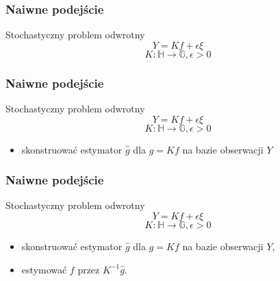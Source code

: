 \documentclass{beamer}
\begin{document}
\begin{frame}\frametitle{Naiwne podejście}
\begin{block}{Stochastyczny problem odwrotny}
\begin{displaymath}
Y=Kf+\epsilon\xi
\end{displaymath}
\begin{displaymath}
K\colon \mathbb{H}\to \mathbb{G}, \epsilon>0
\end{displaymath}
\end{block}
\end{frame}

\begin{frame}\frametitle{Naiwne podejście}
\begin{block}{Stochastyczny problem odwrotny}
\begin{displaymath}
Y=Kf+\epsilon\xi
\end{displaymath}
\begin{displaymath}
K\colon \mathbb{H}\to \mathbb{G}, \epsilon>0
\end{displaymath}
\end{block}
\begin{block}{}
\begin{itemize}
\item skonstruować estymator $\hat{g}$ dla $g=Kf$ na bazie obserwacji $Y$
\end{itemize}
\end{block}
\end{frame}

\begin{frame}\frametitle{Naiwne podejście}
\begin{block}{Stochastyczny problem odwrotny}
\begin{displaymath}
Y=Kf+\epsilon\xi
\end{displaymath}
\begin{displaymath}
K\colon \mathbb{H}\to \mathbb{G}, \epsilon>0
\end{displaymath}
\end{block}
\begin{block}{}
\begin{itemize}
\item skonstruować estymator $\hat{g}$ dla $g=Kf$ na bazie obserwacji $Y$,
\item estymować $f$ przez $K^{-1}\hat{g}$.
\end{itemize}
\end{block}
\end{frame}
\end{document}
